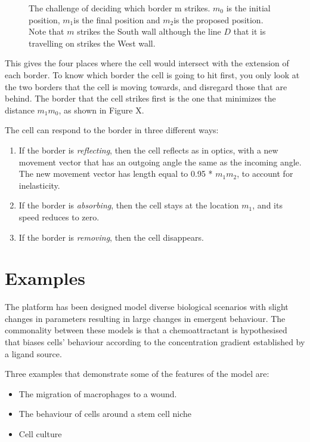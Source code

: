 \documentclass[11.5pt]{article}
\begin{document}
\begin{figure}[H]
\centering
\caption{The challenge of deciding which border m 
  strikes. \(m_0\) is the initial position, \(m_1\)is the final 
  position and \(m_2\)is the proposed position. Note that \(m\) strikes 
  the South wall although the line \(D\) that it is travelling on strikes the 
West wall.}
\end{figure}

This gives the four places where the cell would intersect with the 
extension of each border. To know which border the cell is going to hit 
first, you only look at the two borders that the cell is moving towards, 
and disregard those that are behind. The border that the cell strikes 
first is the one that minimizes the distance \(m_1m_0\), as 
shown in Figure X. 

The cell can respond to the border in three different ways: 

\begin{enumerate}
  \item If the border is {\itshape reflecting}, then the cell reflects as in optics, 
with a new movement vector that has an outgoing angle the same as the 
incoming angle. The new movement vector has length equal to 0.95 * \(m_1m_2\), 
to account for inelasticity.
\item If the border is {\itshape absorbing}, then the cell stays at the location \(m_1\), 
  and its speed reduces to zero.
\item If the border is {\itshape removing}, then the cell disappears.
\end{enumerate}

\section{Examples}
The platform has been designed model diverse biological scenarios with 
slight changes in parameters resulting in large changes in emergent 
behaviour. The commonality between these models is that a 
chemoattractant is hypothesised that biases cells' behaviour according 
to the concentration gradient established by a ligand source.

Three examples that demonstrate some of the features of the model are:

\begin{itemize}
\item The migration of macrophages to a wound.
\item The behaviour of cells around a stem cell niche
\item Cell culture
\end{itemize}
\end{document}
